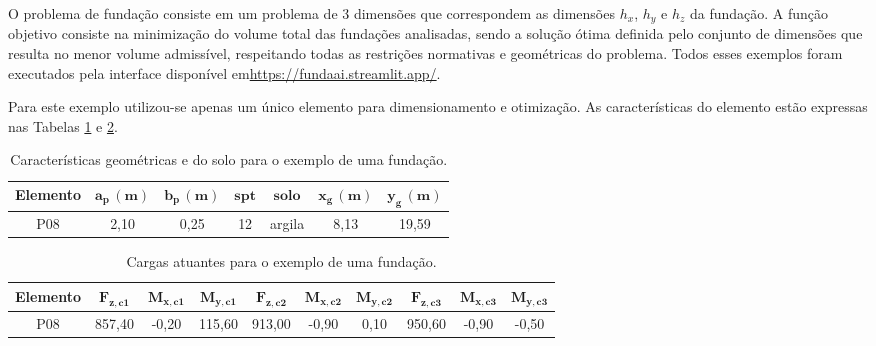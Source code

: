 O problema de fundação consiste em um problema de 3 dimensões que correspondem as dimensões $h_x$, $h_y$ e $h_z$ da fundação. A função objetivo consiste na minimização do volume total das fundações analisadas, sendo a solução ótima definida pelo conjunto de dimensões que resulta no menor volume admissível, respeitando todas as restrições normativas e geométricas do problema. Todos esses exemplos foram executados pela interface disponível em\url{https://fundaai.streamlit.app/}.


\label{item:um_elemento}

Para este exemplo utilizou-se apenas um único elemento para dimensionamento e otimização. As características do elemento estão expressas nas Tabelas \ref{tab:um_elemento} e \ref{tab:carga_um_elemento}.

\begin{table}[htbp!]
\centering
\caption{Características geométricas e do solo para o exemplo de uma fundação.}


\label{tab:um_elemento}
\setlength{\tabcolsep}{5pt}
\begin{tabular}{ c c c c c c c}
\toprule
\textbf{Elemento} &
$\mathbf{a_p \, (m)}$ &
$\mathbf{b_p \, (m)}$ &
$\mathbf{spt}$ &
$\mathbf{solo}$ &
$\mathbf{x_g \, (m)}$ &
$\mathbf{y_g \, (m)}$\\
\midrule
P08 & 2,10 & 0,25 & 12 & argila & 8,13 & 19,59 \\

\bottomrule
\end{tabular}
\end{table}

\begin{table}[htpb!]
\centering
\caption{Cargas atuantes para o exemplo de uma fundação.}
\label{tab:carga_um_elemento}
\setlength{\tabcolsep}{5pt}
\begin{tabular}{ c c c c c c c c c c}
\toprule
\textbf{Elemento} &
$\mathbf{F_{z,c1}}$ &
$\mathbf{M_{x,c1}}$ &
$\mathbf{M_{y,c1}}$ &
$\mathbf{F_{z,c2}}$ &
$\mathbf{M_{x,c2}}$ &
$\mathbf{M_{y,c2}}$ &
$\mathbf{F_{z,c3}}$ &
$\mathbf{M_{x,c3}}$ &
$\mathbf{M_{y,c3}}$ \\
\midrule
P08 & 857,40 & -0,20 & 115,60 & 913,00 & -0,90 & 0,10 & 950,60 & -0,90 & -0,50 \\

\bottomrule
\end{tabular}
\end{table}


